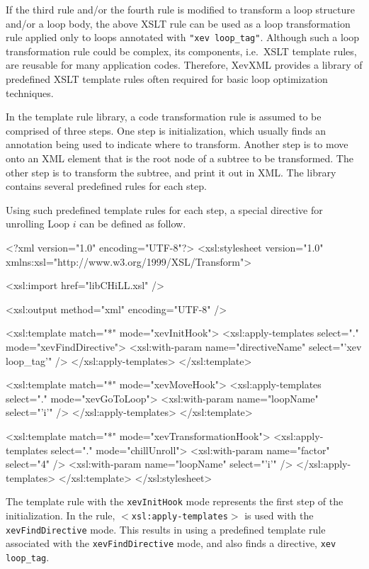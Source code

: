 If the third rule and/or the fourth rule is modified to transform a loop
structure and/or a loop body, the above XSLT rule can be used as a loop
transformation rule applied only to loops annotated with \texttt{"xev
loop\_tag"}. Although such a loop transformation rule could be complex,
its components, i.e.~XSLT template rules, are reusable for many
application codes.  Therefore, XevXML provides a library of predefined
XSLT template rules often required for basic loop optimization techniques.


In the template rule library, a code transformation rule is assumed to
be comprised of three steps. One step is initialization, which usually
finds an annotation being used to indicate where to transform. Another
step is to move onto an XML element that is the root node of a subtree
to be transformed. The other step is to transform the subtree, and print
it out in XML. The library contains several predefined rules for each
step.

Using such predefined template rules for each step, a special directive
for unrolling Loop $i$ can be defined as follow.
\begin{framed}
 \begin{src}
<?xml version="1.0" encoding="UTF-8"?>
  <xsl:stylesheet version="1.0"
  xmlns:xsl="http://www.w3.org/1999/XSL/Transform">

  <xsl:import href="libCHiLL.xsl" />

  <xsl:output method="xml" encoding="UTF-8" />

  <xsl:template match="*" mode="xevInitHook">
   <xsl:apply-templates select="." mode="xevFindDirective">
      <xsl:with-param name="directiveName" select="'xev loop_tag'" />
    </xsl:apply-templates>
  </xsl:template>

  <xsl:template match="*" mode="xevMoveHook">
    <xsl:apply-templates select="." mode="xevGoToLoop">
      <xsl:with-param name="loopName" select="'i'" />
    </xsl:apply-templates>
  </xsl:template>

  <xsl:template match="*" mode="xevTransformationHook">
    <xsl:apply-templates select="." mode="chillUnroll">
      <xsl:with-param name="factor" select="4" />
      <xsl:with-param name="loopName" select="'i'" />
    </xsl:apply-templates>
  </xsl:template>
</xsl:stylesheet>
\end{src}
\end{framed}

The template rule with the \texttt{xevInitHook} mode represents the
first step of the initialization. In the rule,
\texttt{$<$xsl:apply-templates$>$} is used with the
\texttt{xevFindDirective} mode. This results in using a predefined
template rule associated with the \texttt{xevFindDirective} mode, and
also finds a directive, \texttt{xev loop\_tag}.

